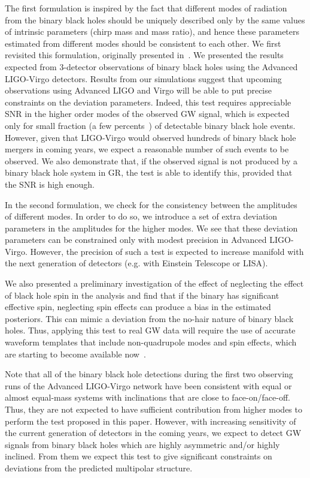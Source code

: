 \documentclass[prd,preprintnumbers,twocolumn,eqsecnum,floatfix,a4paper,nofootinbib,superscriptaddress]{revtex4}
\begin{document}
The first formulation is inspired by the fact that different modes of radiation from the binary black holes should be uniquely described only by the same values of intrinsic parameters (chirp mass and mass ratio), and hence these parameters estimated from different modes should be consistent to each other. We first revisited this formulation, originally presented in~\cite{Dhanpal:2018ufk}. We presented the results expected from 3-detector observations of binary black holes using the Advanced LIGO-Virgo detectors. Results from our simulations suggest that upcoming observations using Advanced LIGO and Virgo will be able to put precise constraints on the deviation parameters. Indeed, this test requires appreciable SNR in the higher order modes of the observed GW signal, which is expected only for small fraction (a few percents~\cite{Dhanpal:2018ufk}) of detectable binary black hole events. However, given that LIGO-Virgo would observed hundreds of binary black hole mergers in coming years, we expect a reasonable number of such events to be observed. We also demonstrate that, if the observed signal is not produced by a binary black hole system in GR, the test is able to identify this, provided that the SNR is high enough. 

In the second formulation, we check for the consistency between the amplitudes of different modes. In order to do so, we introduce a set of extra deviation parameters in the amplitudes for the higher modes. We see that these deviation parameters can be constrained only with modest precision in Advanced LIGO-Virgo. However, the precision of such a test is expected to increase manifold with the next generation of detectors (e.g. with Einstein Telescope or LISA). 

We also presented a preliminary investigation of the effect of neglecting the effect of black hole spin in the analysis and find that if the binary has significant effective spin, neglecting spin effects can produce a bias in the estimated posteriors. This can mimic a deviation from the no-hair nature of binary black holes. Thus, applying this test to real GW data will require the use of accurate waveform templates that include non-quadrupole modes and spin effects, which are starting to become available now~\cite{london2018first,cotesta2018enriching}. 

Note that all of the binary black hole detections during the first two observing runs of the Advanced LIGO-Virgo network have been consistent with equal or almost equal-mass systems with inclinations that are close to face-on/face-off. Thus, they are not expected to have sufficient contribution from higher modes to perform the test proposed in this paper. However, with increasing sensitivity of the current generation of detectors in the coming years, we expect to detect GW signals from binary black holes which are highly asymmetric and/or highly inclined. From them we expect this test to give significant constraints on deviations from the predicted multipolar structure. 
\end{document}

